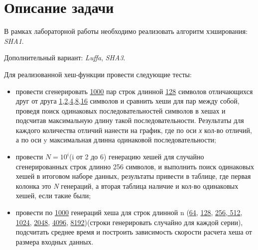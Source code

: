 \documentclass[12pt, a4paper]{report}
\begin{document}
	\section*{Описание задачи}
	\large
	В рамках лабораторной работы необходимо реализовать алгоритм хэширования: \textit{SHA1}. \par
	Дополнительный вариант: \textit{Luffa}, \textit{SHA3}. \par
	Для реализованной хеш-функции провести следующие тесты:
	\begin{itemize}
		\item провести сгенерировать \underline{1000} пар строк длинной \underline{128} символов отличающихся друг от друга \underline{1},\underline{2},\underline{4},\underline{8},\underline{16} символов и сравнить хеши для пар между собой, проведя поиск одинаковых последовательностей символов в хешах и подсчитав максимальную длину такой последовательности. Результаты для каждого количества отличий нанести на график, где по оси \textit{х} кол-во отличий, а по оси y максимальная длинна одинаковой последовательности;
		\item провести $N = 10^{i}$(i от 2 до 6) генерацию хешей для случайно сгенерированных строк длинно 256 символов, и выполнить поиск одинаковых хешей в итоговом наборе данных, результаты привести в таблице, где первая колонка это \textit{N} генераций, а вторая таблица наличие и кол-во одинаковых хешей, если такие были;
		\item провести по \underline{1000} генераций хеша для строк длинной n (\underline{64}, \underline{128}, \underline{256},\underline{ 512}, \underline{1024}, \underline{2048}, \underline{4096}, \underline{8192})(строки генерировать случайно для каждой серии), подсчитать среднее время и построить зависимость скорости расчета хеша от размера входных данных.
	\end{itemize}

	\newpage
\end{document}
